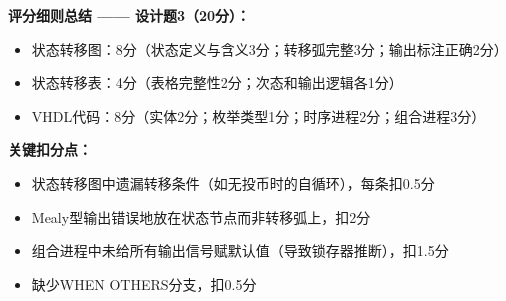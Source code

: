 \vspace{0.5cm}
\begin{framed}
\textbf{评分细则总结 —— 设计题3（20分）：}
\begin{itemize}
\item 状态转移图：8分（状态定义与含义3分；转移弧完整3分；输出标注正确2分）
\item 状态转移表：4分（表格完整性2分；次态和输出逻辑各1分）
\item VHDL代码：8分（实体2分；枚举类型1分；时序进程2分；组合进程3分）
\end{itemize}

\textbf{关键扣分点：}
\begin{itemize}
\item 状态转移图中遗漏转移条件（如无投币时的自循环），每条扣0.5分
\item Mealy型输出错误地放在状态节点而非转移弧上，扣2分
\item 组合进程中未给所有输出信号赋默认值（导致锁存器推断），扣1.5分
\item 缺少WHEN OTHERS分支，扣0.5分
\end{itemize}
\end{framed}

\endinput
